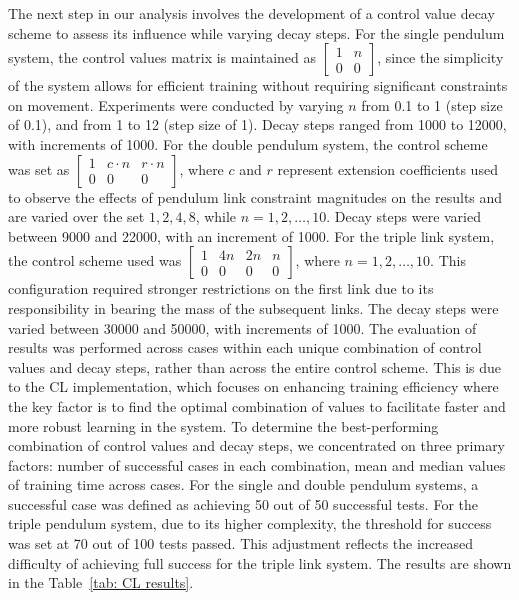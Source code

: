The next step in our analysis involves the development of a control value decay scheme to assess its influence while varying decay steps. For the single pendulum system, the control values matrix is maintained as \(\begin{bmatrix} 1 & n \\ 0 & 0 \end{bmatrix}\), since the simplicity of the system allows for efficient training without requiring significant constraints on movement. Experiments were conducted by varying $n$ from 0.1 to 1 (step size of 0.1), and from 1 to 12 (step size of 1). Decay steps ranged from 1000 to 12000, with increments of 1000. 
For the double pendulum system, the control scheme was set as \(\begin{bmatrix} 1 & c \cdot n & r \cdot n \\ 0 & 0 & 0 \end{bmatrix}\), where $c$ and $r$ represent extension coefficients used to observe the effects of pendulum link constraint magnitudes on the results and are varied over the set \({1, 2, 4, 8}\), while \(n = 1, 2, \ldots, 10\). Decay steps were varied between 9000 and 22000, with an increment of 1000. 
For the triple link system, the control scheme used was \(\begin{bmatrix} 1 & 4n & 2n & n \\ 0 & 0 & 0 & 0 \end{bmatrix}\), where \(n = 1, 2, \ldots, 10\). This configuration required stronger restrictions on the first link due to its responsibility in bearing the mass of the subsequent links. The decay steps were varied between 30000 and 50000, with increments of 1000.
The evaluation of results was performed across cases within each unique combination of control values and decay steps, rather than across the entire control scheme. This is due to the CL implementation, which focuses on enhancing training efficiency where the key factor is to find the optimal combination of values to facilitate faster and more robust learning in the system. To determine the best-performing combination of control values and decay steps, we concentrated on three primary factors: number of successful cases in each combination, mean and median values of training time across cases. For the single and double pendulum systems, a successful case was defined as achieving 50 out of 50 successful tests. For the triple pendulum system, due to its higher complexity, the threshold for success was set at 70 out of 100 tests passed. This adjustment reflects the increased difficulty of achieving full success for the triple link system. The results are shown in the Table~\ref{tab: CL results}.

